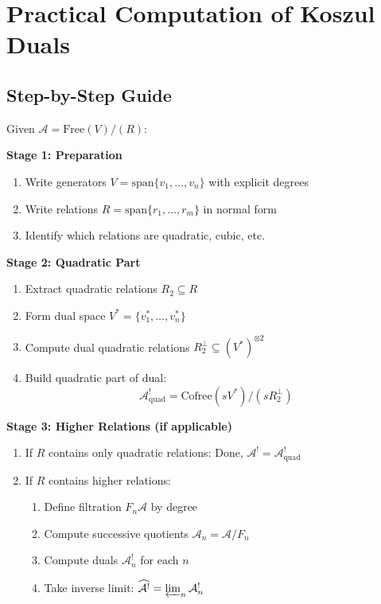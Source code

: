 
\section{Practical Computation of Koszul Duals}
\label{sec:practical-computation}

\subsection{Step-by-Step Guide}

\begin{procedure}\label{proc:compute-koszul-dual}
Given $\mathcal{A} = \text{Free}(V) / (R)$:

\textbf{Stage 1: Preparation}
\begin{enumerate}
\item Write generators $V = \text{span}\{v_1, \ldots, v_n\}$ with explicit degrees
\item Write relations $R = \text{span}\{r_1, \ldots, r_m\}$ in normal form
\item Identify which relations are quadratic, cubic, etc.
\end{enumerate}

\textbf{Stage 2: Quadratic Part}
\begin{enumerate}
\item Extract quadratic relations $R_2 \subseteq R$
\item Form dual space $V^* = \{v_1^*, \ldots, v_n^*\}$
\item Compute dual quadratic relations $R_2^\perp \subseteq (V^*)^{\otimes 2}$
\item Build quadratic part of dual:
      $$\mathcal{A}^!_{\text{quad}} = \text{Cofree}(sV^*) / (sR_2^\perp)$$
\end{enumerate}

\textbf{Stage 3: Higher Relations (if applicable)}
\begin{enumerate}
\item If $R$ contains only quadratic relations: Done, $\mathcal{A}^! = \mathcal{A}^!_{\text{quad}}$
\item If $R$ contains higher relations:
   \begin{enumerate}
   \item Define filtration $F_n\mathcal{A}$ by degree
   \item Compute successive quotients $\mathcal{A}_n = \mathcal{A} / F_n$
   \item Compute duals $\mathcal{A}_n^!$ for each $n$
   \item Take inverse limit: $\widehat{\mathcal{A}^!} = \varprojlim_n \mathcal{A}_n^!$
   \end{enumerate}
\end{enumerate}


\end{procedure}
